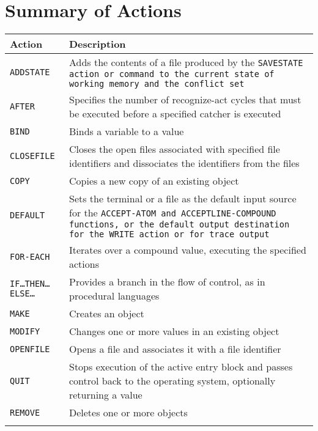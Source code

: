 \section{Summary of Actions}

\begin{longtable}{p{4cm}p{11cm}}
  \toprule
  Action & Description \\
  \midrule
  \tt{ADDSTATE} & Adds the contents of a file produced by the \tt{SAVESTATE}
                  action or command to the current state of working memory
                  and the conflict set \\\addlinespace
  \tt{AFTER} & Specifies the number of recognize-act cycles that must be
               executed before a specified
               catcher is executed \\\addlinespace
  \tt{BIND} & Binds a variable to a value \\\addlinespace
  \tt{CLOSEFILE} & Closes the open files associated with specified file
                   identifiers and dissociates the
                   identifiers from the files \\\addlinespace
  \tt{COPY} & Copies a new copy of an existing object \\\addlinespace
  \tt{DEFAULT} & Sets the terminal or a file as the default
                 input source for the \tt{ACCEPT-ATOM} and         
                 \tt{ACCEPTLINE-COMPOUND} functions, or the default 
                 output destination for the \tt{WRITE} action or for
                 trace output  \\
  \tt{FOR-EACH} & Iterates over a compound value, executing the 
                  specified actions \\\addlinespace
  \tt{IF}\ldots\tt{THEN}\ldots\tt{ELSE}\ldots & Provides a branch in the flow of control, as 
                                                in procedural languages \\\addlinespace
  \tt{MAKE} & Creates an object \\\addlinespace
  \tt{MODIFY} & Changes one or more values in an existing
                object \\\addlinespace
  \tt{OPENFILE} & Opens a file and associates it with a file
                  identifier \\\addlinespace
  \tt{QUIT} & Stops execution of the active entry block and
              passes control back to the operating system,
              optionally returning a value \\\addlinespace
  \tt{REMOVE} & Deletes one or more objects \\\addlinespace

\end{longtable}
